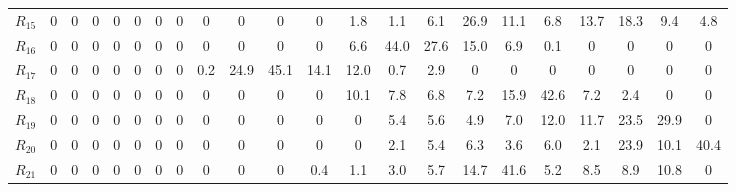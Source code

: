 \begin{table}[h!]
\begin{tabularx}{\textwidth}{X|CCCCCCCCCCCCCCCCCCCCC}
$R_{15}$ & 0 & 0 & 0 & 0 & 0 & 0 & 0 & 0 & 0 & 0 & 0 & 1.8 & 1.1 & 6.1 & 26.9 & 11.1 & 6.8 & 13.7 & 18.3 & 9.4 & 4.8 \\
$R_{16}$ & 0 & 0 & 0 & 0 & 0 & 0 & 0 & 0 & 0 & 0 & 0 & 6.6 & 44.0 & 27.6 & 15.0 & 6.9 & 0.1 & 0 & 0 & 0 & 0 \\
$R_{17}$ & 0 & 0 & 0 & 0 & 0 & 0 & 0 & 0.2 & 24.9 & 45.1 & 14.1 & 12.0 & 0.7 & 2.9 & 0 & 0 & 0 & 0 & 0 & 0 & 0 \\
$R_{18}$ & 0 & 0 & 0 & 0 & 0 & 0 & 0 & 0 & 0 & 0 & 0 & 10.1 & 7.8 & 6.8 & 7.2 & 15.9 & 42.6 & 7.2 & 2.4 & 0 & 0 \\
$R_{19}$ & 0 & 0 & 0 & 0 & 0 & 0 & 0 & 0 & 0 & 0 & 0 & 0 & 5.4 & 5.6 & 4.9 & 7.0 & 12.0 & 11.7 & 23.5 & 29.9 & 0 \\
$R_{20}$ & 0 & 0 & 0 & 0 & 0 & 0 & 0 & 0 & 0 & 0 & 0 & 0 & 2.1 & 5.4 & 6.3 & 3.6 & 6.0 & 2.1 & 23.9 & 10.1 & 40.4 \\
$R_{21}$ & 0 & 0 & 0 & 0 & 0 & 0 & 0 & 0 & 0 & 0 & 0.4 & 1.1 & 3.0 & 5.7 & 14.7 & 41.6 & 5.2 & 8.5 & 8.9 & 10.8 & 0 \\
\bottomrule
\end{tabularx}
\end{table}
